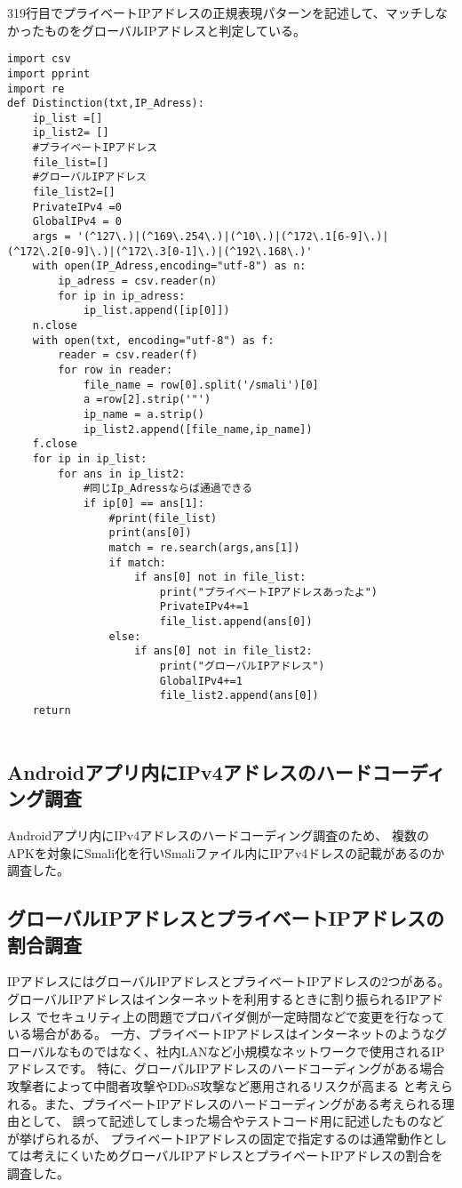 \documentclass[a4j]{jarticle}
\begin{document}
319行目でプライベートIPアドレスの正規表現パターンを記述して、マッチしなかったものをグローバルIPアドレスと判定している。

\begin{lstlisting}
import csv
import pprint
import re
def Distinction(txt,IP_Adress):
	ip_list =[]
	ip_list2= []
	#プライベートIPアドレス
	file_list=[]
	#グローバルIPアドレス
	file_list2=[]
	PrivateIPv4 =0
	GlobalIPv4 = 0
	args = '(^127\.)|(^169\.254\.)|(^10\.)|(^172\.1[6-9]\.)|(^172\.2[0-9]\.)|(^172\.3[0-1]\.)|(^192\.168\.)'
	with open(IP_Adress,encoding="utf-8") as n:
		ip_adress = csv.reader(n)
		for ip in ip_adress:
			ip_list.append([ip[0]])
	n.close
	with open(txt, encoding="utf-8") as f:
		reader = csv.reader(f)
		for row in reader:
			file_name = row[0].split('/smali')[0]
			a =row[2].strip('"')
			ip_name = a.strip()
			ip_list2.append([file_name,ip_name])
	f.close
	for ip in ip_list:
		for ans in ip_list2:
			#同じIp_Adressならば通過できる
			if ip[0] == ans[1]:
				#print(file_list)
				print(ans[0])
				match = re.search(args,ans[1])
				if match:
					if ans[0] not in file_list:
						print("プライベートIPアドレスあったよ")
						PrivateIPv4+=1
						file_list.append(ans[0])
				else:
					if ans[0] not in file_list2:
						print("グローバルIPアドレス")
						GlobalIPv4+=1
						file_list2.append(ans[0])
	return
	
\end{lstlisting}

\subsection{Androidアプリ内にIPv4アドレスのハードコーディング調査}
Androidアプリ内にIPv4アドレスのハードコーディング調査のため、
複数のAPKを対象にSmali化を行いSmaliファイル内にIPアv4ドレスの記載があるのか調査した。
\subsection{グローバルIPアドレスとプライベートIPアドレスの割合調査}
IPアドレスにはグローバルIPアドレスとプライベートIPアドレスの2つがある。
グローバルIPアドレスはインターネットを利用するときに割り振られるIPアドレス
でセキュリティ上の問題でプロバイダ側が一定時間などで変更を行なっている場合がある。
一方、プライベートIPアドレスはインターネットのようなグローバルなものではなく、社内LANなど小規模なネットワークで使用されるIPアドレスです。
特に、グローバルIPアドレスのハードコーディングがある場合攻撃者によって中間者攻撃やDDoS攻撃など悪用されるリスクが高まる
と考えられる。また、プライベートIPアドレスのハードコーディングがある考えられる理由として、
誤って記述してしまった場合やテストコード用に記述したものなどが挙げられるが、
プライベートIPアドレスの固定で指定するのは通常動作としては考えにくいためグローバルIPアドレスとプライベートIPアドレスの割合を調査した。
\end{document}
